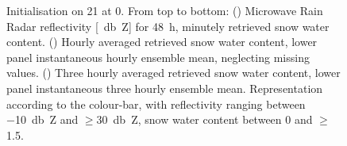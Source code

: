 \begin{figure}[H]
\begin{subfigure}[t]{1.05\textwidth}
		\caption{}\label{fig:SWC3h:21}
	\end{subfigure}
	\caption{Initialisation on \SI{21}{\dec} at \SI{0}{\UTC}. From top to bottom: (\protect{}) Microwave Rain Radar reflectivity [\SI{}{\decibel Z}] for \SI{48}{\hour}, minutely retrieved snow water content.
		(\protect{}) Hourly averaged retrieved snow water content, lower panel instantaneous hourly ensemble mean, %
		neglecting missing values. 
		(\protect{}) Three hourly averaged retrieved snow water content, lower panel instantaneous three hourly ensemble mean. Representation according to the colour-bar, with reflectivity ranging between \SI{-10}{\decibel Z} and $\ge$\SI{30}{\decibel Z}, snow water content between \SI{0}{\SWC} and $\ge$\SI{1.5}{\SWC}.  %
	}\label{fig:SWC21}
\end{figure}
